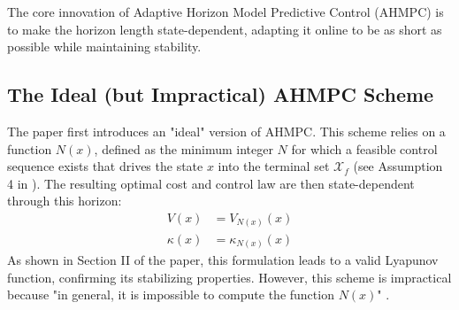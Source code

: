 The core innovation of Adaptive Horizon Model Predictive Control (AHMPC) is to make the horizon length state-dependent, adapting it online to be as short as possible while maintaining stability.

\subsection{The Ideal (but Impractical) AHMPC Scheme}
The paper first introduces an "ideal" version of AHMPC. This scheme relies on a function $N(x)$, defined as the minimum integer $N$ for which a feasible control sequence exists that drives the state $x$ into the terminal set $\mathcal{X}_f$ (see Assumption 4 in \cite{krener2016adaptive}). The resulting optimal cost and control law are then state-dependent through this horizon:
\begin{align}
    V(x) &= V_{N(x)}(x) \label{eq:ideal_cost} \\
    \kappa(x) &= \kappa_{N(x)}(x) \label{eq:ideal_control}
\end{align}
As shown in Section II of the paper, this formulation leads to a valid Lyapunov function, confirming its stabilizing properties. However, this scheme is impractical because "in general, it is impossible to compute the function $N(x)$" \cite{krener2016adaptive}.

